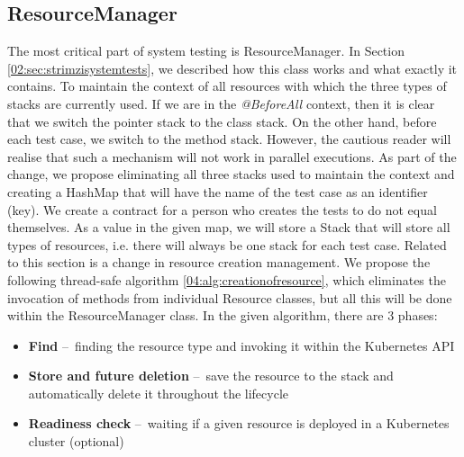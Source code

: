 \subsection{ResourceManager}

The most critical part of system testing is ResourceManager.
In Section \ref {02:sec:strimzisystemtests}, we described how this class works and what exactly it contains.
To maintain the context of all resources with which the three types of stacks are currently used.
If we are in the \emph{@BeforeAll} context, then it is clear that we switch the pointer stack to the class stack.
On the other hand, before each test case, we switch to the method stack.
However, the cautious reader will realise that such a mechanism will not work in parallel executions.
As part of the change, we propose eliminating all three stacks used to maintain the context and creating a HashMap that will have the name of the test case as an identifier (key).
We create a contract for a person who creates the tests to do not equal themselves.
As a value in the given map, we will store a Stack that will store all types of resources, i.e. there will always be one stack for each test case.
Related to this section is a change in resource creation management.
We propose the following thread-safe algorithm \ref{04:alg:creationofresource}, which eliminates the invocation of methods from individual Resource classes, but all this will be done within the ResourceManager class.
In the given algorithm, there are 3 phases:

\begin{itemize}[itemsep=1mm, parsep=0pt]
    \item \textbf{Find} \---\ finding the resource type and invoking it within the Kubernetes API
    \item \textbf {Store and future deletion} \---\ save the resource to the stack and automatically delete it throughout the lifecycle
    \item \textbf {Readiness check} \---\ waiting if a given resource is deployed in a Kubernetes cluster (optional)
\end{itemize}

